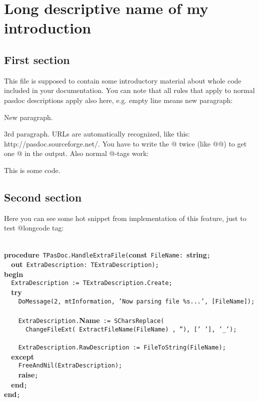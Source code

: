 \documentclass{report}
\begin{document}
\newlength{\tmplength}
\chapter{Long descriptive name of my introduction}
 

 

\section{First section}


This file is supposed to contain some introductory material about whole code included in your documentation. You can note that all rules that apply to normal pasdoc descriptions apply also here, e.g. empty line means new paragraph:

New paragraph.

3rd paragraph. URLs are automatically recognized, like this: http://pasdoc.sourceforge.net/. You have to write the @ twice (like @@) to get one @ in the output. Also normal @{-}tags work: \begin{ttfamily}This is some code.\end{ttfamily}

\section{Second section}


Here you can see some hot snippet from implementation of this feature, just to test @longcode tag:

\texttt{\\\nopagebreak[3]
}\textbf{procedure}\texttt{~TPasDoc.HandleExtraFile(}\textbf{const}\texttt{~FileName:~}\textbf{string}\texttt{;\\\nopagebreak[3]
~~}\textbf{out}\texttt{~ExtraDescription:~TExtraDescription);\\\nopagebreak[3]
}\textbf{begin}\texttt{\\\nopagebreak[3]
~~ExtraDescription~:=~TExtraDescription.Create;\\\nopagebreak[3]
~~}\textbf{try}\texttt{\\\nopagebreak[3]
~~~~DoMessage(2,~mtInformation,~'Now~parsing~file~{\%}s...',~[FileName]);\\\nopagebreak[3]
\\\nopagebreak[3]
~~~~ExtraDescription.}\textbf{Name}\texttt{~:=~SCharsReplace(\\\nopagebreak[3]
~~~~~~ChangeFileExt(~ExtractFileName(FileName)~,~''),~['~'],~'{\_}');\\\nopagebreak[3]
\\\nopagebreak[3]
~~~~ExtraDescription.RawDescription~:=~FileToString(FileName);\\\nopagebreak[3]
~~}\textbf{except}\texttt{\\\nopagebreak[3]
~~~~FreeAndNil(ExtraDescription);\\\nopagebreak[3]
~~~~}\textbf{raise}\texttt{;\\\nopagebreak[3]
~~}\textbf{end}\texttt{;\\\nopagebreak[3]
}\textbf{end}\texttt{;\\
}
\end{document}
